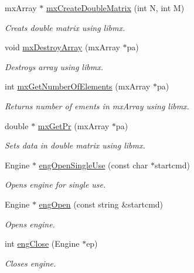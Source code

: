 \begin{DoxyCompactItemize}
mx\-Array $\ast$ \hyperlink{class_c_m_a_t_l_a_b_ae408d55b19b8f44d766a59958cea73e2}{mx\-Create\-Double\-Matrix} (int N, int M)
\begin{DoxyCompactList}\small\item\em Creats double matrix using libmx. \end{DoxyCompactList}\item 
void \hyperlink{class_c_m_a_t_l_a_b_a86a22fb54ea27d07cf617c544bd47e2c}{mx\-Destroy\-Array} (mx\-Array $\ast$pa)
\begin{DoxyCompactList}\small\item\em Destroys array using libmx. \end{DoxyCompactList}\item 
int \hyperlink{class_c_m_a_t_l_a_b_a9b3c4de338f1db76c505ae86c50f1023}{mx\-Get\-Number\-Of\-Elements} (mx\-Array $\ast$pa)
\begin{DoxyCompactList}\small\item\em Returns number of ements in mx\-Array using libmx. \end{DoxyCompactList}\item 
double $\ast$ \hyperlink{class_c_m_a_t_l_a_b_acdc8c6598199d6d5df97b36cd1864383}{mx\-Get\-Pr} (mx\-Array $\ast$pa)
\begin{DoxyCompactList}\small\item\em Sets data in double matrix using libmx. \end{DoxyCompactList}\item 
Engine $\ast$ \hyperlink{class_c_m_a_t_l_a_b_a15e0b9066c9103355a8223c2922a4a6d}{eng\-Open\-Single\-Use} (const char $\ast$startcmd)
\begin{DoxyCompactList}\small\item\em Opens engine for single use. \end{DoxyCompactList}\item 
Engine $\ast$ \hyperlink{class_c_m_a_t_l_a_b_ac6d7a9542ecc6119dfb7e00024517143}{eng\-Open} (const string \&startcmd)
\begin{DoxyCompactList}\small\item\em Opens engine. \end{DoxyCompactList}\item 
int \hyperlink{class_c_m_a_t_l_a_b_ae68aee94c253c02f5d7318fe1148b889}{eng\-Close} (Engine $\ast$ep)
\begin{DoxyCompactList}\small\item\em Closes engine. \end{DoxyCompactList}\item 

\end{DoxyCompactItemize}
